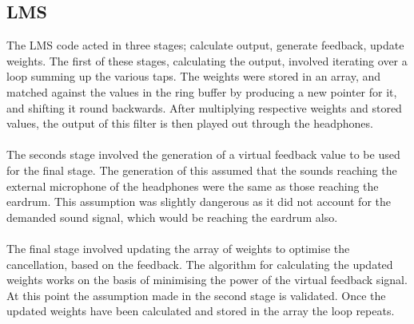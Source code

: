 \subsection{LMS}
\label{ssec:implelms}
The LMS code acted in three stages; calculate output, generate feedback, update weights.
The first of these stages, calculating the output, involved iterating over a loop summing up the various taps.
The weights were stored in an array, and matched against the values in the ring buffer by producing a new pointer for it, and shifting it round backwards.
After multiplying respective weights and stored values, the output of this filter is then played out through the headphones.
\\
\\
The seconds stage involved the generation of a virtual feedback value to be used for the final stage.
The generation of this assumed that the sounds reaching the external microphone of the headphones were the same as those reaching the eardrum.
This assumption was slightly dangerous as it did not account for the demanded sound signal, which would be reaching the eardrum also.
\\
\\
The final stage involved updating the array of weights to optimise the cancellation, based on the feedback.
The algorithm for calculating the updated weights works on the basis of minimising the power of the virtual feedback signal.
At this point the assumption made in the second stage is validated.
Once the updated weights have been calculated and stored in the array the loop repeats.
